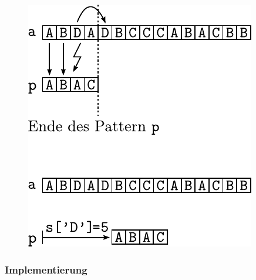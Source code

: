 \begin{figure}[h!]
	\centering
	\includegraphics[scale=0.9]{../fig/quicksearch-7.pdf}
\end{figure}

\subsubsection{Implementierung}




